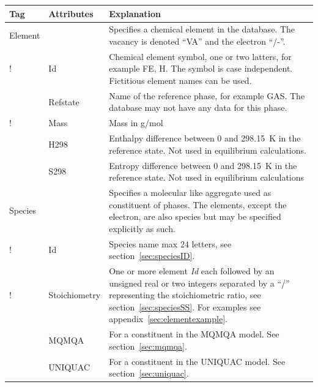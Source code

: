 \documentclass{article}
\begin{document}
\begin{tabular}{|p{} p{} p{}|}\hline
  Tag & Attributes & Explanation\\\hline

  Element & & Specifies a chemical element in the database.  The vacancy is denoted ``VA'' and the electron ``/-''.\\
!          & Id        &  Chemical element symbol, one or two latters, 
                         for example FE, H.  The symbol is case independent.
                         Fictitious element names can be used. \\
          & Refstate  &  Name of the reference  phase, for example GAS.  The
                         database may not have any data for this phase. \\
!          & Mass      &  Mass in g/mol\\
          & H298      &  Enthalpy difference between 0 and 298.15~K 
                         in the reference state.  Not used in equilibrium
                         calculations. \\
          & S298      &  Entropy difference between 0 and 298.15~K in 
                         the reference state.  Not used in equilibrium
                         calculations\\\hline

  Species & & Specifies a molecular like aggregate used as constituent of phases.  The elements, except the electron, are also species but may be specified explicitly as such.\\
!          & Id        & Species name max 24 letters, see 
                        section~\ref{sec:speciesID}.\\
!          & Stoichiometry & One or more element {\em Id} each followed by 
                        an unsigned real or two integers separated by a ``/'' 
                        representing the stoichiometric ratio,
                        see section~\ref{sec:speciesSS}.  For examples see
                        appendix~\ref{sec:elementexample}.\\
          & MQMQA     & For a constituent in the MQMQA model.  See 
                        section~\ref{sec:mqmqa}.\\
          & UNIQUAC   & For a constituent in the UNIQUAC model. See 
                        section~\ref{sec:uniquac}.\\\hline

\end{tabular}
\end{document}
